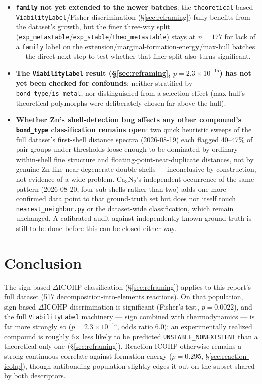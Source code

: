 \documentclass[11pt,a4paper]{article}
\begin{document}
\begin{itemize}
    negative) --- a pooled feature search would be misleading here; any
    future search should be run separately per \texttt{bond\_type}.
  \item \textbf{\texttt{family} not yet extended to the newer batches}:
    the \texttt{theoretical}-based \texttt{ViabilityLabel}/Fisher
    discrimination (\S\ref{sec:reframing}) fully benefits from the
    dataset's growth, but the finer three-way split
    (\texttt{exp\_metastable}/\texttt{exp\_stable}/\texttt{theo\_metastable})
    stays at $n=177$ for lack of a \texttt{family} label on the
    extension/marginal-formation-energy/max-hull batches --- the direct
    next step to test whether that finer split also turns significant.
  \item \textbf{The \texttt{ViabilityLabel} result (\S\ref{sec:reframing},
    $p=2.3\times10^{-15}$) has not yet been checked for confounds}:
    neither stratified by \texttt{bond\_type}/\texttt{is\_metal}, nor
    distinguished from a selection effect (max-hull's theoretical
    polymorphs were deliberately chosen far above the hull).
  \item \textbf{Whether Zn's shell-detection bug affects any other
    compound's \texttt{bond\_type} classification remains open}: two
    quick heuristic sweeps of the full dataset's first-shell distance
    spectra (2026-08-19) each flagged 40--47\% of pair-groups under
    thresholds loose enough to be dominated by ordinary within-shell
    fine structure and floating-point-near-duplicate distances, not by
    genuine Zn-like near-degenerate double shells --- inconclusive by
    construction, not evidence of a wide problem. Ca$_3$N$_2$'s
    independent occurrence of the same pattern (2026-08-20, four
    sub-shells rather than two) adds one more confirmed data point to
    that ground-truth set but does not itself touch
    \texttt{nearest\_neighbor.py} or the dataset-wide classification,
    which remain unchanged. A calibrated audit against independently
    known ground truth is still to be done before this can be closed
    either way.
\end{itemize}

\section{Conclusion}

The sign-based $\Delta$ICOHP classification
(\S\ref{sec:reframing}) applies to this
report's full dataset (517 decomposition-into-elements reactions). On
that population, sign-based $\Delta$ICOHP discrimination is
significant (Fisher's test, $p=0.0022$), and the full
\texttt{ViabilityLabel} machinery --- sign combined with thermodynamics
--- is far more strongly so ($p=2.3\times10^{-15}$, odds ratio 6.0): an
experimentally realized compound is roughly 6$\times$ less likely to be
predicted \texttt{UNSTABLE\_NONEXISTENT} than a theoretical-only one
(\S\ref{sec:reframing}). Reaction ICOHP otherwise remains a strong
continuous correlate against formation energy ($\rho=0.295$,
\S\ref{sec:reaction-icohp}), though antibonding population slightly
edges it out on the subset shared by both descriptors.
\end{document}
